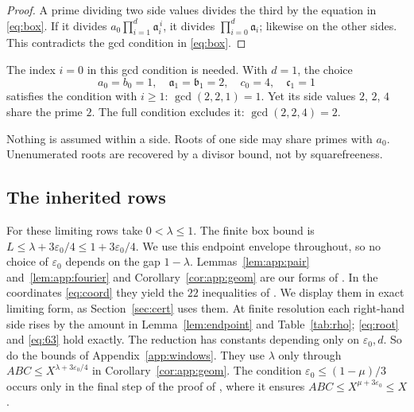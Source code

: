 \documentclass{amsart}
\theoremstyle{definition}
\theoremstyle{plain}
\numberwithin{equation}{section}
\numberwithin{table}{section}
\begin{document}
\begin{proof}
 A prime dividing two side values divides the third by the equation in
\eqref{eq:box}. If it divides
$a_0\prod_{i=1}^d\mathfrak a_i^{\,i}$, it divides $\prod_{i=0}^d\mathfrak a_i$;
likewise on the other sides. This contradicts the gcd condition in
\eqref{eq:box}.
\end{proof}

The index $i=0$ in this gcd condition is needed. With $d=1$, the choice
\[
 a_0=b_0=1,\quad \mathfrak a_1=\mathfrak b_1=2,\quad c_0=4,\quad \mathfrak c_1=1
\]
satisfies the condition with $i\ge1$: $\gcd(2,2,1)=1$. Yet its side values
$2$, $2$, $4$ share the prime $2$. The
full condition excludes it: $\gcd(2,2,4)=2$.

Nothing is assumed within a side. Roots of one side may share primes with
$a_0$. Unenumerated roots are recovered by a divisor bound, not by
squarefreeness.

\subsection{The inherited rows}
For these limiting rows take $0<\lambda\le1$. The finite box bound is
$L\le\lambda+3\varepsilon_0/4\le1+3\varepsilon_0/4$. We use this endpoint
envelope throughout, so no choice of $\varepsilon_0$ depends on the gap
$1-\lambda$.
Lemmas~\ref{lem:app:pair} and~\ref{lem:app:fourier} and
Corollary~\ref{cor:app:geom} are our forms of
\cite[Propositions~2.3, 3.1 and 4.1]{BBLT}. In the coordinates \eqref{eq:coord}
they yield the $22$ inequalities of \cite[Proposition~6.1]{BBLT}. We display them in exact limiting
form, as Section~\ref{sec:cert} uses them. At finite resolution each
right-hand side rises by the amount in Lemma~\ref{lem:endpoint} and
Table~\ref{tab:rho}; \eqref{eq:root} and \eqref{eq:63} hold exactly.
The reduction has constants depending only on $\varepsilon_0,d$. So do the
bounds of Appendix~\ref{app:windows}. They use $\lambda$ only through
$ABC\le X^{\lambda+3\varepsilon_0/4}$ in Corollary~\ref{cor:app:geom}. The
condition $\varepsilon_0\le(1-\mu)/3$ occurs only in the final step of the
proof of \cite[Theorem~1.3]{BBLT}, where it ensures
$ABC\le X^{\mu+3\varepsilon_0}\le X$.
\end{document}
